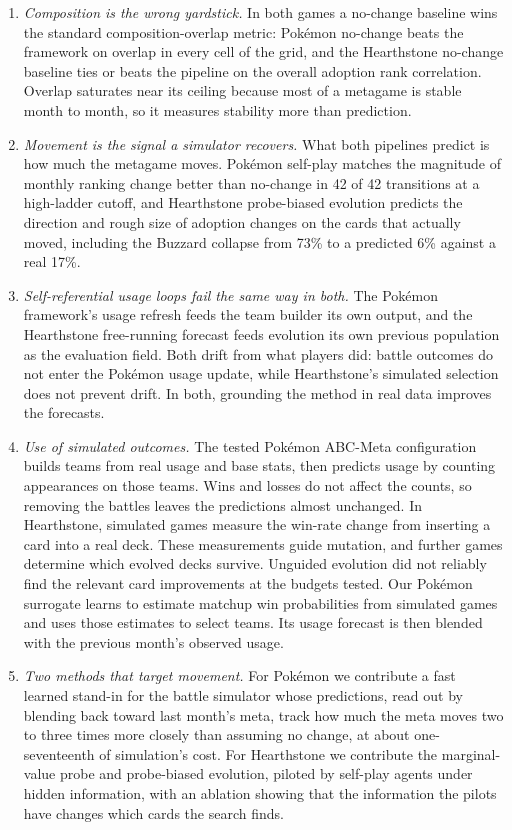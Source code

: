 \documentclass[journal]{IEEEtran}
\newcommand{\pkmn}{Pok\'emon}
\begin{document}
\begin{enumerate}
\item \emph{Composition is the wrong yardstick.} In both games a
no-change baseline wins the standard composition-overlap metric: \pkmn{}
no-change beats the framework on overlap in every cell of the grid, and
the Hearthstone no-change baseline ties or beats the pipeline on the
overall adoption rank correlation. Overlap saturates near its ceiling because most of a
metagame is stable month to month, so it measures stability more than
prediction.
\item \emph{Movement is the signal a simulator recovers.} What both
pipelines predict is how much the metagame moves. \pkmn{} self-play
matches the magnitude of monthly ranking change better than no-change
in 42 of 42 transitions at a high-ladder cutoff, and Hearthstone
probe-biased evolution predicts the direction and rough size of adoption
changes on the cards that actually moved, including the Buzzard collapse
from 73\% to a predicted 6\% against a real 17\%.
\item \emph{Self-referential usage loops fail the same way in both.} The
\pkmn{} framework's usage refresh feeds the team builder its own output,
and the Hearthstone free-running forecast feeds evolution its own
previous population as the evaluation field. Both drift from what players
did: battle outcomes do not enter the \pkmn{} usage update, while
Hearthstone's simulated selection does not prevent drift. In both,
grounding the method in real data improves the forecasts.
\item \emph{Use of simulated outcomes.}
The tested \pkmn{} ABC-Meta configuration builds teams from real usage
and base stats, then predicts usage by counting appearances on those
teams. Wins and losses do not affect the counts, so removing the battles
leaves the predictions almost unchanged. In Hearthstone, simulated games
measure the win-rate change from inserting a card into a real deck.
These measurements guide mutation, and further games determine which
evolved decks survive. Unguided evolution did not reliably find the
relevant card improvements at the budgets tested. Our \pkmn{} surrogate
learns to estimate matchup win probabilities from simulated games and
uses those estimates to select teams. Its usage forecast is then blended
with the previous month's observed usage.
\item \emph{Two methods that target movement.} For \pkmn{} we contribute
a fast learned stand-in for the battle simulator whose predictions, read out by blending back toward last month's meta, track how much the meta moves two to three times more closely than assuming no change, at about one-seventeenth of simulation's cost. For Hearthstone we contribute the
marginal-value probe and probe-biased evolution, piloted by self-play
agents under hidden information, with an ablation showing that the
information the pilots have changes which cards the search finds.
\end{enumerate}
\end{document}
